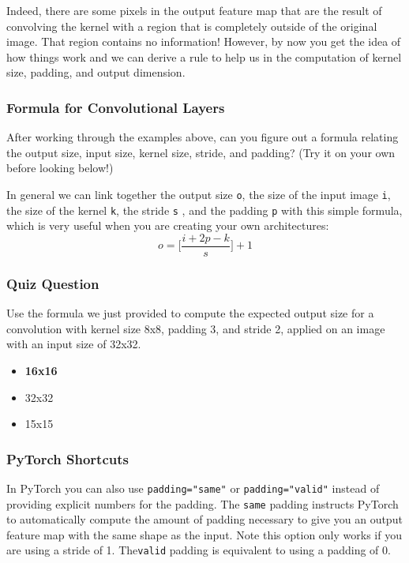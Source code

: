 Indeed, there are some pixels in the output feature map that are the result of convolving the kernel with a region that is completely outside of the original image. That region contains no information! However, by now you get the idea of how things work and we can derive a rule to help us in the computation of kernel size, padding, and output dimension.

\subsubsection{Formula for Convolutional Layers}

After working through the examples above, can you figure out a formula relating the output size, input size, kernel size, stride, and padding? (Try it on your own before looking below!) \newline

In general we can link together the output size \verb|o|, the size of the input image \verb|i|, the size of the kernel \verb|k|, the stride \verb|s| , and the padding \verb|p| with this simple formula, which is very useful when you are creating your own architectures:
\[o = \Bigg[\frac{i + 2p - k}{s}\Bigg] + 1 \]


\subsubsection{Quiz Question}

Use the formula we just provided to compute the expected output size for a convolution with kernel size 8x8, padding 3, and stride 2, applied on an image with an input size of 32x32.

\begin{itemize}
    \item \textbf{16x16}
    \item 32x32
    \item 15x15
\end{itemize}

\subsubsection{PyTorch Shortcuts}

In PyTorch you can also use \lstinline{padding="same"} or \lstinline{padding="valid"} instead of providing explicit numbers for the padding. The \lstinline{same} padding instructs PyTorch to automatically compute the amount of padding necessary to give you an output feature map with the same shape as the input. Note this option only works if you are using a stride of 1. The\lstinline{valid} padding is equivalent to using a padding of 0.


